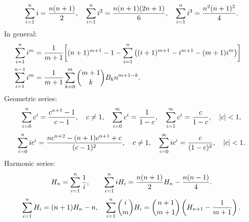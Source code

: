 $$ \sum_{i=1}^n i = {n(n+1) \over 2}, \quad
\sum_{i=1}^n i^2 = {n(n+1)(2n+1) \over 6}, \quad
\sum_{i=1}^n i^3 = {n^2(n+1)^2 \over 4}.$$
In general:
\begin{align*}
\sum_{i=1}^n i^m &= {1 \over m+1} \bigg[ (n+1)^{m+1} - 1 - \sum_{i=1}^n \big((i+1)^{m+1} - i^{m+1} - (m+1)i^m\big) \bigg] \cr
\sum_{i=1}^{n-1} i^m &= {1 \over m+1}\sum_{k=0}^m {m+1 \choose k} B_k n^{m+1-k}. \cr
\end{align*}
Geometric series:
$$ \sum_{i=0}^n c^i = {c^{n+1} - 1 \over c -1}, \quad c \neq 1, \quad
\sum_{i=0}^\infty c^i = {1 \over 1 - c}, \quad
\sum_{i=1}^\infty c^i = {c \over 1 - c}, \quad \vert c \vert < 1,$$
$$ \sum_{i=0}^n i c^i = { nc^{n+2} - (n+1)c^{n+1} + c \over (c-1)^2}, \quad c \neq 1, \quad
\sum_{i=0}^\infty i c^i = {c \over (1 - c)^2}, \quad \vert c \vert < 1.$$
Harmonic series:
$$
H_n = \sum_{i=1}^n {1 \over i}, \qquad
\sum_{i=1}^n iH_i = {n(n+1) \over 2}H_n - {n(n-1) \over 4}.
$$
$$
\sum_{i=1}^n H_i = (n+1)H_n - n, \quad
\sum_{i=1}^n {i \choose m } H_i = { n+1 \choose m+1} \left(H_{n+1} - {1 \over m+1}\right).
$$


